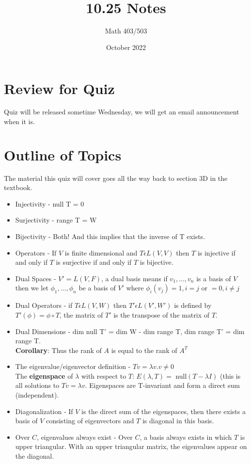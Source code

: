 \documentclass{article}
\title{10.25 Notes}
\author{Math 403/503 }
\date{October 2022}
\begin{document}
\maketitle

\section{Review for Quiz}
Quiz will be released sometime Wednesday, we will get an email announcement when it is. 
\section{Outline of Topics}
The material this quiz will cover goes all the way back to section 3D in the textbook.
\begin{itemize}
    \item Injectivity - null T = 0 
    \item Surjectivity - range T = W 
    \item Bijectivity - Both! And this implies that the inverse of T exists. 
    \item Operators - If $V$ is finite dimensional and $T \epsilon L(V,V)$ then $T$ is injective if and only if $T$ is surjective if and only if $T$ is bijective. 
    \item Dual Spaces - $V' = L(V,F)$, a dual basis means if $v_1, ..., v_n$ is a basis of $V$ then we let $\phi_1, ..., \phi_n$ be a basis of $V'$ where $\phi_i(v_j) = 1, i = j$ or $= 0, i \neq j$ 
    \item Dual Operators - if $T \epsilon L(V,W)$ then $T' \epsilon L(V', W')$ is defined by $T'(\phi) = \phi \circ T$, the matrix of $T'$ is the transpose of the matrix of $T$. 
    \item Dual Dimensions - dim null T' = dim W - dim range T, dim range T' = dim range T. \\
    \textbf{Corollary}: Thus the rank of $A$ is equal to the rank of $A^{T}$
    \item The eigenvalue/eigenvector definition  - $Tv = \lambda v. v \neq 0$\\
    The \textbf{eigenspace} of $\lambda$ with respect to $T$: $E(\lambda, T) =$ null$(T-\lambda I)$ (this is all solutions to $Tv = \lambda v$. Eigenspaces are T-invariant and form a direct sum (independent).
    \item Diagonalization - If $V$ is the direct sum of the eigenspaces, then there exists a basis of $V$ consisting of eigenvectors and $T$ is diagonal in this basis. 
    \item Over $C$, eigenvalues always exist - Over $C$, a basis always exists in which $T$ is upper triangular. With an upper triangular matrix, the eigenvalues appear on the diagonal. 

\end{itemize}
\end{document}
